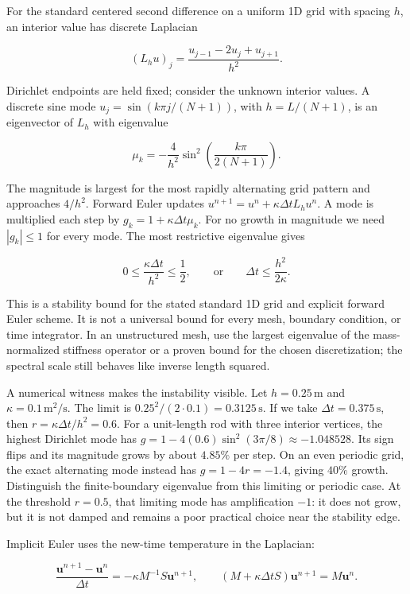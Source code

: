 For the standard centered second difference on a uniform 1D grid with spacing \(h\), an interior value has discrete Laplacian

\[
(L_hu)_j=\frac{u_{j-1}-2u_j+u_{j+1}}{h^2}.
\]

Dirichlet endpoints are held fixed; consider the unknown interior values. A discrete sine mode \(u_j=\sin(k\pi j/(N+1))\), with \(h=L/(N+1)\), is an eigenvector of \(L_h\) with eigenvalue

\[
\mu_k=-\frac{4}{h^2}\sin^2\left(\frac{k\pi}{2(N+1)}\right).
\]

The magnitude is largest for the most rapidly alternating grid pattern and approaches \(4/h^2\). Forward Euler updates \(u^{n+1}=u^n+\kappa\Delta t L_hu^n\). A mode is multiplied each step by \(g_k=1+\kappa\Delta t\mu_k\). For no growth in magnitude we need \(|g_k|\le1\) for every mode. The most restrictive eigenvalue gives

\[
0\le\frac{\kappa\Delta t}{h^2}\le\frac12,
\qquad\text{or}\qquad
\Delta t\le\frac{h^2}{2\kappa}.
\]

This is a stability bound for the stated standard 1D grid and explicit forward Euler scheme. It is not a universal bound for every mesh, boundary condition, or time integrator. In an unstructured mesh, use the largest eigenvalue of the mass-normalized stiffness operator or a proven bound for the chosen discretization; the spectral scale still behaves like inverse length squared.

A numerical witness makes the instability visible. Let \(h=0.25\,\mathrm m\) and \(\kappa=0.1\,\mathrm{m^2/s}\). The limit is \(0.25^2/(2\cdot0.1)=0.3125\,\mathrm s\). If we take \(\Delta t=0.375\,\mathrm s\), then \(r=\kappa\Delta t/h^2=0.6\). For a unit-length rod with three interior vertices, the highest Dirichlet mode has \(g=1-4(0.6)\sin^2(3\pi/8)\approx-1.048528\). Its sign flips and its magnitude grows by about \(4.85\%\) per step. On an even periodic grid, the exact alternating mode instead has \(g=1-4r=-1.4\), giving \(40\%\) growth. Distinguish the finite-boundary eigenvalue from this limiting or periodic case. At the threshold \(r=0.5\), that limiting mode has amplification \(-1\): it does not grow, but it is not damped and remains a poor practical choice near the stability edge.

Implicit Euler uses the new-time temperature in the Laplacian:

\[
\frac{\mathbf u^{n+1}-\mathbf u^n}{\Delta t}=-\kappa M^{-1}S\mathbf u^{n+1},
\qquad
(M+\kappa\Delta tS)\mathbf u^{n+1}=M\mathbf u^n.
\]

